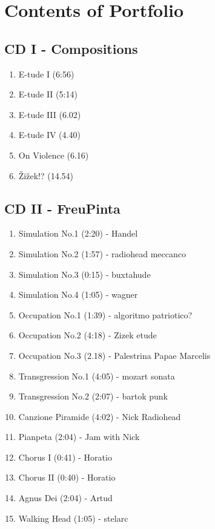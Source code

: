 \chapter*{Contents of Portfolio}
\hypertarget{portfolio}{}

\section*{CD I - Compositions}

\begin{enumerate}
\item E-tude I (6:56)
\item E-tude II (5:14)
\item E-tude III (6.02)
\item E-tude IV (4.40)
\item On Violence (6.16)
\item \v{Z}i\v{z}ek!? (14.54)
\end{enumerate}

\section*{CD II - FreuPinta}

\begin{enumerate}
\item Simulation No.1 (2:20) - Handel
\item Simulation No.2 (1:57) - radiohead meccanco
\item Simulation No.3 (0:15) - buxtahude
\item Simulation No.4 (1:05) - wagner
\item Occupation No.1 (1:39) - algoritmo patriotico?
\item Occupation No.2 (4:18) - Zizek etude
\item Occupation No.3 (2.18) - Palestrina Papae Marcelis
\item Transgression No.1 (4:05) - mozart sonata
\item Transgression No.2 (2:07) - bartok punk

\item Canzione Piramide (4:02) - Nick Radiohead
\item Pianpeta (2:04) - Jam with Nick

\item Chorus I (0:41) - Horatio
\item Chorus II (0:40) - Horatio
\item Agnus Dei (2:04) - Artud
\item Walking Head (1:05) - stelarc

\end{enumerate}

